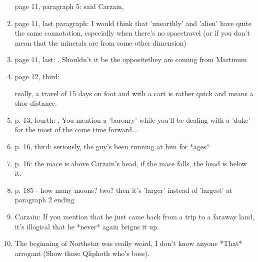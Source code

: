 \begin{garbage}
\begin{enumerate}
    page 11, paragraph 5: 
     said Carzain, 
  \item 
    page 11, last paragraph:  I would think that 'unearthly' and 'alien' have quite the same connotation, especially when there's no spacetravel (or if you don't mean that the minerals are from some other dimension)
  \item 
    page 11, last: 
    .  Shouldn't it be the opposite\dash they are coming from Martinum
  \item 
    page 12, third: 
    
    really, a travel of 15 days on foot and with a cart is rather quick and means a shor distance.
  \item 
    p. 13, fourth: , You mention a 'baronry' while you'll be dealing with a 'duke' for the most of the come time forward... 
  \item 
    p. 16, third:  seriously, the guy's been running at him for *ages*
  \item 
    p. 16: the mace is above Carzain's head, if the mace falls, the head is below it.
  \item 
    p. 185 - how many moons? two? then it's 'larger' instead of 'largest' at paragraph 2 ending
  \item 
    Carzain: If you mention that he just came back from a trip to a faraway land, it's illogical that he *never* again brigns it up. 
  \item 
    The beginning of Northstar was really weird, I don't know anyone *That* arrogant (Show those Qliphoth who's boss). 
\end{enumerate}























\chapter{\TheKenosis}

\end{garbage}
